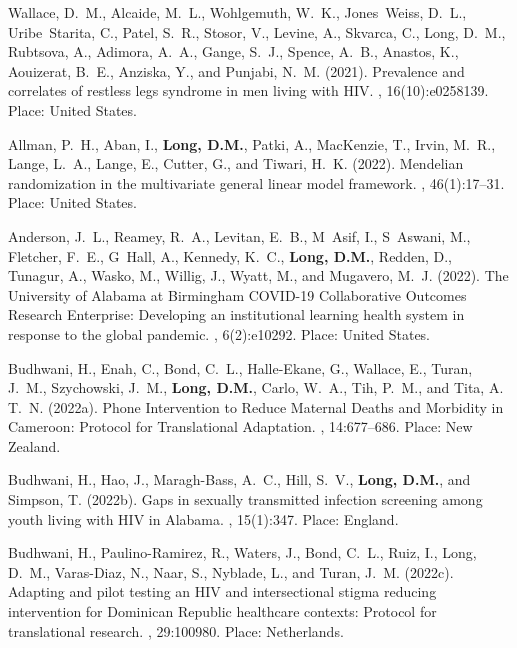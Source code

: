 \begin{thebibliography}{}
Wallace, D.~M., Alcaide, M.~L., Wohlgemuth, W.~K., Jones~Weiss, D.~L.,
  Uribe~Starita, C., Patel, S.~R., Stosor, V., Levine, A., Skvarca, C., Long,
  D.~M., Rubtsova, A., Adimora, A.~A., Gange, S.~J., Spence, A.~B., Anastos,
  K., Aouizerat, B.~E., Anziska, Y., and Punjabi, N.~M. (2021).
\newblock Prevalence and correlates of restless legs syndrome in men living
  with {HIV}.
, 16(10):e0258139.
\newblock Place: United States.

Allman, P.~H., Aban, I., \textbf{Long, D.M.}, Patki, A., MacKenzie, T., Irvin, M.~R.,
  Lange, L.~A., Lange, E., Cutter, G., and Tiwari, H.~K. (2022).
\newblock Mendelian randomization in the multivariate general linear model
  framework.
, 46(1):17--31.
\newblock Place: United States.

Anderson, J.~L., Reamey, R.~A., Levitan, E.~B., M~Asif, I., S~Aswani, M.,
  Fletcher, F.~E., G~Hall, A., Kennedy, K.~C., \textbf{Long, D.M.}, Redden, D., Tunagur,
  A., Wasko, M., Willig, J., Wyatt, M., and Mugavero, M.~J. (2022).
\newblock The {University} of {Alabama} at {Birmingham} {COVID}-19
  {Collaborative} {Outcomes} {Research} {Enterprise}: {Developing} an
  institutional learning health system in response to the global pandemic.
, 6(2):e10292.
\newblock Place: United States.

Budhwani, H., Enah, C., Bond, C.~L., Halle-Ekane, G., Wallace, E., Turan,
  J.~M., Szychowski, J.~M., \textbf{Long, D.M.}, Carlo, W.~A., Tih, P.~M., and Tita, A.
  T.~N. (2022a).
 {Phone} {Intervention} to {Reduce} {Maternal} {Deaths} and
  {Morbidity} in {Cameroon}: {Protocol} for {Translational} {Adaptation}.
, 14:677--686.
\newblock Place: New Zealand.

Budhwani, H., Hao, J., Maragh-Bass, A.~C., Hill, S.~V., \textbf{Long, D.M.}, and
  Simpson, T. (2022b).
\newblock Gaps in sexually transmitted infection screening among youth living
  with {HIV} in {Alabama}.
, 15(1):347.
\newblock Place: England.

Budhwani, H., Paulino-Ramirez, R., Waters, J., Bond, C.~L., Ruiz, I., Long,
  D.~M., Varas-Diaz, N., Naar, S., Nyblade, L., and Turan, J.~M. (2022c).
\newblock Adapting and pilot testing an {HIV} and intersectional stigma
  reducing intervention for {Dominican} {Republic} healthcare contexts:
  {Protocol} for translational research.
, 29:100980.
\newblock Place: Netherlands.


\end{thebibliography}
